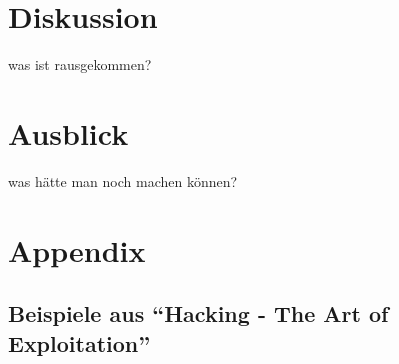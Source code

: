 \documentclass[11pt, a4paper]{article}
\begin{document}
\section{Diskussion}
was ist rausgekommen?

\section{Ausblick}
was hätte man noch machen können?


\appendix
\newpage
\renewcommand{\thesubsection}{\Alph{subsection}}
\pagebreak

\section{Appendix}
\subsection{Beispiele aus ``Hacking - The Art of Exploitation''~\cite{erickson2008hacking}}\label{subsec:beispiele}



\newpage
\printbibliography
\listoffigures
\listoftables
\printglossaries
\end{document}
